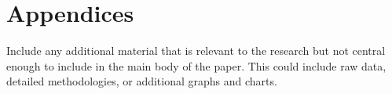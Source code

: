 \section{Appendices}
Include any additional material that is relevant to the research but not central enough to include in the main body of the paper. This could include raw data, detailed methodologies, or additional graphs and charts.